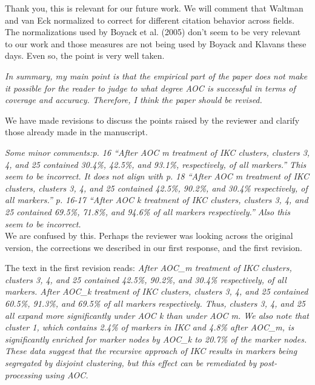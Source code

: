 \documentclass[11pt, oneside]{article}   	%
\begin{document}
 \vspace{2 mm} 
 Thank you, this is relevant for our future work. We will comment that Waltman and van Eck normalized to correct for different citation behavior across fields. The normalizations used by Boyack et al. (2005) don't seem to be very relevant to our work and those measures are not being used by Boyack and Klavans these days. Even so, the point is very well taken. 

\vspace{2 mm} 
 \emph{In summary, my main point is that the empirical part of the paper does not make it possible for the reader to judge to what degree AOC is successful in terms of coverage and accuracy. Therefore, I think the paper should be revised.}  
 
 \vspace{2 mm} 
 We have made revisions to discuss the points raised by the reviewer and clarify those already made in the manuscript.

\vspace{2 mm} 
 \emph{Some minor comments:p. 16 “After AOC m treatment of IKC clusters, clusters 3, 4, and 25 contained 30.4\%, 42.5\%, and 93.1\%, respectively, of all markers.” This seem to be incorrect. It does not align with p. 18 “After AOC m treatment of IKC clusters, clusters 3, 4, and 25 contained 42.5\%, 90.2\%, and 30.4\% respectively, of all markers.” p. 16-17 “After AOC k treatment of IKC clusters, clusters 3, 4, and 25 contained 69.5\%, 71.8\%, and 94.6\% of all markers respectively.” Also this seem to be incorrect.} \\

We are confused by this. Perhaps the reviewer was looking across the original version, the corrections we described in our first response, and the first revision. 

The text in the first revision reads: \emph{After AOC\_m treatment of IKC clusters, clusters 3, 4, and 25 contained 42.5\%, 90.2\%, and 30.4\% respectively, of all markers. After AOC\_k treatment of IKC clusters, clusters 3, 4, and 25 contained 60.5\%, 91.3\%, and 69.5\% of all markers respectively. Thus, clusters 3, 4, and 25 all expand more significantly under AOC k than under AOC m. We also note that cluster 1, which contains 2.4\% of markers in IKC and 4.8\% after AOC\_m, is significantly enriched for marker nodes by AOC\_k to 20.7\% of the marker nodes. These data suggest that the recursive approach of IKC results in markers being segregated by disjoint clustering, but this effect can be remediated by post-processing using AOC.}
\end{document}
